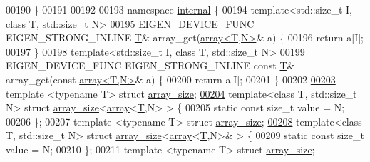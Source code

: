 \begin{DoxyCode}
00190 \}
00191 
00192 
00193 \textcolor{keyword}{namespace }\hyperlink{namespaceinternal}{internal} \{
00194 \textcolor{keyword}{template}<std::\textcolor{keywordtype}{size\_t} I, \textcolor{keyword}{class} T, std::\textcolor{keywordtype}{size\_t} N>
00195 EIGEN\_DEVICE\_FUNC EIGEN\_STRONG\_INLINE \hyperlink{group___sparse_core___module}{T}& array\_get(\hyperlink{class_eigen_1_1array}{array<T,N>}& a) \{
00196   \textcolor{keywordflow}{return} a[I];
00197 \}
00198 \textcolor{keyword}{template}<std::\textcolor{keywordtype}{size\_t} I, \textcolor{keyword}{class} T, std::\textcolor{keywordtype}{size\_t} N>
00199 EIGEN\_DEVICE\_FUNC EIGEN\_STRONG\_INLINE \textcolor{keyword}{const} \hyperlink{group___sparse_core___module}{T}& array\_get(\textcolor{keyword}{const} \hyperlink{class_eigen_1_1array}{array<T,N>}& a) \{
00200   \textcolor{keywordflow}{return} a[I];
00201 \}
00202 
\hyperlink{struct_eigen_1_1internal_1_1array__size}{00203} \textcolor{keyword}{template} <\textcolor{keyword}{typename} T> \textcolor{keyword}{struct }\hyperlink{struct_eigen_1_1internal_1_1array__size}{array\_size};
\hyperlink{struct_eigen_1_1internal_1_1array__size_3_01array_3_01_t_00_01_n_01_4_01_4}{00204} \textcolor{keyword}{template}<\textcolor{keyword}{class} T, std::\textcolor{keywordtype}{size\_t} N> \textcolor{keyword}{struct }\hyperlink{struct_eigen_1_1internal_1_1array__size}{array\_size}<\hyperlink{class_eigen_1_1array}{array}<\hyperlink{group___sparse_core___module}{T},N> > \{
00205   \textcolor{keyword}{static} \textcolor{keyword}{const} \textcolor{keywordtype}{size\_t} value = N;
00206 \};
00207 \textcolor{keyword}{template} <\textcolor{keyword}{typename} T> \textcolor{keyword}{struct }\hyperlink{struct_eigen_1_1internal_1_1array__size}{array\_size};
\hyperlink{struct_eigen_1_1internal_1_1array__size_3_01array_3_01_t_00_01_n_01_4_01_6_4}{00208} \textcolor{keyword}{template}<\textcolor{keyword}{class} T, std::\textcolor{keywordtype}{size\_t} N> \textcolor{keyword}{struct }\hyperlink{struct_eigen_1_1internal_1_1array__size}{array\_size}<\hyperlink{class_eigen_1_1array}{array}<\hyperlink{group___sparse_core___module}{T},N>& > \{
00209   \textcolor{keyword}{static} \textcolor{keyword}{const} \textcolor{keywordtype}{size\_t} value = N;
00210 \};
00211 \textcolor{keyword}{template} <\textcolor{keyword}{typename} T> \textcolor{keyword}{struct }\hyperlink{struct_eigen_1_1internal_1_1array__size}{array\_size};

\end{DoxyCode}
